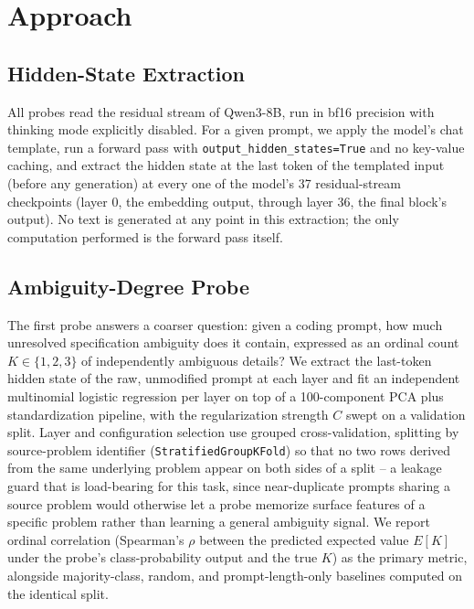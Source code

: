 \section{Approach}
\label{sec:approach}

\subsection{Hidden-State Extraction}

All probes read the residual stream of Qwen3-8B, run in bf16 precision with
thinking mode explicitly disabled. For a given prompt, we apply the model's
chat template, run a forward pass with \texttt{output\_hidden\_states=True}
and no key-value caching, and extract the hidden state at the last token of
the templated input (before any generation) at every one of the model's 37
residual-stream checkpoints (layer 0, the embedding output, through layer
36, the final block's output). No text is generated at any point in this
extraction; the only computation performed is the forward pass itself.

\subsection{Ambiguity-Degree Probe}
\label{sec:approach:k-probe}

The first probe answers a coarser question: given a coding prompt, how much
unresolved specification ambiguity does it contain, expressed as an ordinal
count $K \in \{1, 2, 3\}$ of independently ambiguous details? We extract the
last-token hidden state of the raw, unmodified prompt at each layer and fit
an independent multinomial logistic regression per layer on top of a
100-component PCA plus standardization pipeline, with the regularization
strength $C$ swept on a validation split. Layer and configuration selection
use grouped cross-validation, splitting by source-problem identifier
(\texttt{StratifiedGroupKFold}) so that no two rows derived from the same
underlying problem appear on both sides of a split -- a leakage guard that
is load-bearing for this task, since near-duplicate prompts sharing a
source problem would otherwise let a probe memorize surface features of a
specific problem rather than learning a general ambiguity signal. We report
ordinal correlation (Spearman's $\rho$ between the predicted expected value
$E[K]$ under the probe's class-probability output and the true $K$) as the
primary metric, alongside majority-class, random, and prompt-length-only
baselines computed on the identical split.

